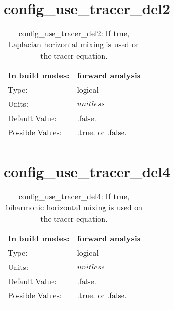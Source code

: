 \section[config\_use\_tracer\_del2]{config\_use\_tracer\_del2}
\label{sec:nm_sec_config_use_tracer_del2}
\begin{center}
\begin{longtable}{| p{2.0in} || p{4.0in} |}
    \hline
    In build modes: & \hyperref[subsec:forward_nm_tab_hmix_del2]{forward} \hyperref[subsec:analysis_nm_tab_hmix_del2]{analysis} \\
    \hline
    Type: & logical \\
    \hline
    Units: & $unitless$ \\
    \hline
    Default Value: & .false. \\
    \hline
    Possible Values: & .true. or .false. \\
    \hline
    \caption{config\_use\_tracer\_del2: If true, Laplacian horizontal mixing is used on the tracer equation.}
\end{longtable}
\end{center}
\section[config\_use\_tracer\_del4]{config\_use\_tracer\_del4}
\label{sec:nm_sec_config_use_tracer_del4}
\begin{center}
\begin{longtable}{| p{2.0in} || p{4.0in} |}
    \hline
    In build modes: & \hyperref[subsec:forward_nm_tab_hmix_del4]{forward} \hyperref[subsec:analysis_nm_tab_hmix_del4]{analysis} \\
    \hline
    Type: & logical \\
    \hline
    Units: & $unitless$ \\
    \hline
    Default Value: & .false. \\
    \hline
    Possible Values: & .true. or .false. \\
    \hline
    \caption{config\_use\_tracer\_del4: If true, biharmonic horizontal mixing is used on the tracer equation.}
\end{longtable}
\end{center}
